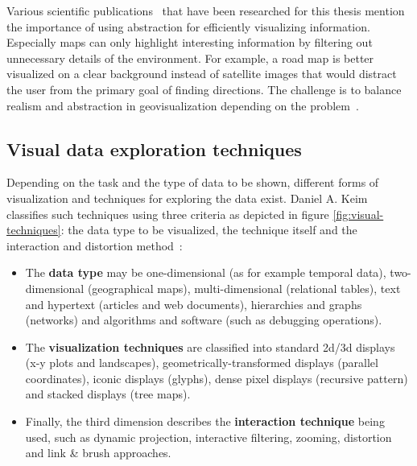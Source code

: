 Various scientific publications~\cite{phillips82clutter, MACEACHREN90apattern, keim2001vis, harvey2008primer, ellis08clutter, Delort10vis, noellenburg11geovis} that have been researched for this thesis mention the importance of using abstraction for efficiently visualizing information. Especially maps can only highlight interesting information by filtering out unnecessary details of the environment. For example, a road map is better visualized on a clear background instead of satellite images that would distract the user from the primary goal of finding directions. The challenge is to balance realism and abstraction in geovisualization depending on the problem~\cite{noellenburg11geovis}.

\subsection{Visual data exploration techniques}

Depending on the task and the type of data to be shown, different forms of visualization and techniques for exploring the data exist. Daniel A. Keim~\cite{keim2001vis} classifies such techniques using three criteria as depicted in figure \ref{fig:visual-techniques}: the data type to be visualized, the technique itself and the interaction and distortion method~\cite{Delort10vis}:

\begin{itemize}

\item The \textbf{data type} may be one-dimensional (as for example temporal data), two-dimensional (geographical maps), multi-dimensional (relational tables), text and hypertext (articles and web documents), hierarchies and graphs (networks) and algorithms and software (such as debugging operations).

\item The \textbf{visualization techniques} are classified into standard 2d/3d displays (x-y plots and landscapes), geometrically-transformed displays (parallel coordinates), iconic displays (glyphs), dense pixel displays (recursive pattern) and stacked displays (tree maps).

\item Finally, the third dimension describes the \textbf{interaction technique} being used, such as dynamic projection, interactive filtering, zooming, distortion and link \& brush approaches.

\end{itemize}

